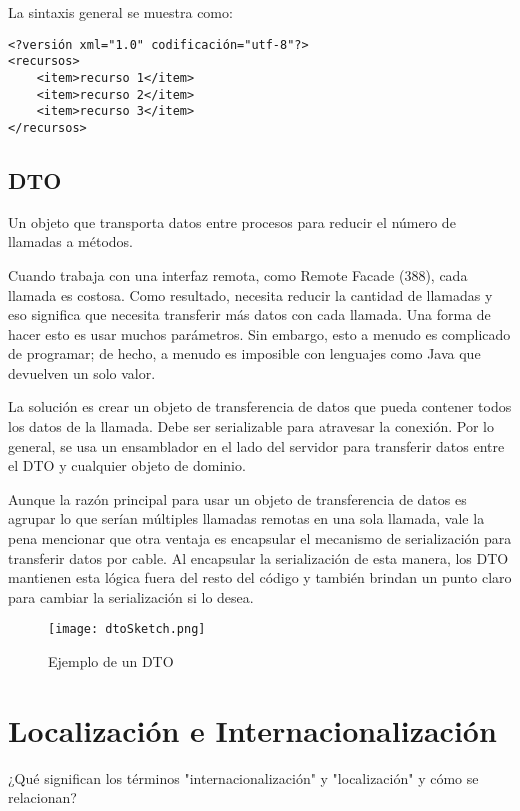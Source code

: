 \begin{enumerate}
La sintaxis general se muestra como:

\begin{lstlisting}
<?versión xml="1.0" codificación="utf-8"?>
<recursos>
	<item>recurso 1</item>
	<item>recurso 2</item>
	<item>recurso 3</item>		
</recursos>

\end{lstlisting}

\subsection{DTO}
\cite{mf}Un objeto que transporta datos entre procesos para reducir el número de llamadas a métodos.

Cuando trabaja con una interfaz remota, como Remote Facade (388), cada llamada es costosa. Como resultado, necesita reducir la cantidad de llamadas y eso significa que necesita transferir más datos con cada llamada. Una forma de hacer esto es usar muchos parámetros. Sin embargo, esto a menudo es complicado de programar; de hecho, a menudo es imposible con lenguajes como Java que devuelven un solo valor.

La solución es crear un objeto de transferencia de datos que pueda contener todos los datos de la llamada. Debe ser serializable para atravesar la conexión. Por lo general, se usa un ensamblador en el lado del servidor para transferir datos entre el DTO y cualquier objeto de dominio.

Aunque la razón principal para usar un objeto de transferencia de datos es agrupar lo que serían múltiples llamadas remotas en una sola llamada, vale la pena mencionar que otra ventaja es encapsular el mecanismo de serialización para transferir datos por cable. Al encapsular la serialización de esta manera, los DTO mantienen esta lógica fuera del resto del código y también brindan un punto claro para cambiar la serialización si lo desea.

\begin{figure}[H]
	\center
	\texttt{[image: dtoSketch.png]}
	\caption{Ejemplo de un DTO}
\end{figure}

\section{Localización e Internacionalización}

\cite{w3}¿Qué significan los términos "internacionalización" y "localización" y cómo se relacionan?


\end{enumerate}
